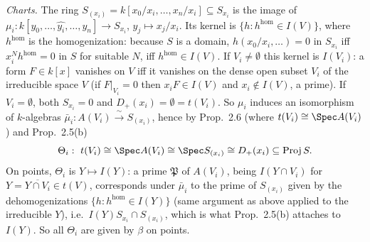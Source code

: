 \documentclass[11pt]{article}
\begin{document}
\emph{Charts.} The ring $S_{(x_i)}=k[x_0/x_i,\dots,x_n/x_i]\subseteq S_{x_i}$ is the image of $\mu_i:k[y_0,\dots,\widehat{y_i},\dots,y_n]\to S_{x_i}$, $y_j\mapsto x_j/x_i$. Its kernel is $\{h: h^{\mathrm{hom}}\in I(V)\}$, where $h^{\mathrm{hom}}$ is the homogenization: because $S$ is a domain, $h(x_0/x_i,\dots)=0$ in $S_{x_i}$ iff $x_i^N h^{\mathrm{hom}}=0$ in $S$ for suitable $N$, iff $h^{\mathrm{hom}}\in I(V)$. If $V_i\neq\emptyset$ this kernel is $I(V_i)$: a form $F\in k[x]$ vanishes on $V$ iff it vanishes on the dense open subset $V_i$ of the irreducible space $V$ (if $F|_{V_i}=0$ then $x_iF\in I(V)$ and $x_i\notin I(V)$, a prime). If $V_i=\emptyset$, both $S_{x_i}=0$ and $D_+(x_i)=\emptyset=t(V_i)$. So $\mu_i$ induces an isomorphism of $k$-algebras $\bar\mu_i:A(V_i)\xrightarrow{\ \sim\ }S_{(x_i)}$, hence by Prop.~2.6 (where $t(V_i)\cong\Spec A(V_i)$) and Prop.~2.5(b)
\[\Theta_i:\ t(V_i)\cong\Spec A(V_i)\cong\Spec S_{(x_i)}\cong D_+(x_i)\subseteq\operatorname{Proj}S.\]
On points, $\Theta_i$ is $Y\mapsto I(Y)$: a prime $\mathfrak P$ of $A(V_i)$, being $I(Y\cap V_i)$ for $Y=\overline{Y\cap V_i}\in t(V)$, corresponds under $\bar\mu_i$ to the prime of $S_{(x_i)}$ given by the dehomogenizations $\{h:h^{\mathrm{hom}}\in I(Y)\}$ (same argument as above applied to the irreducible $Y$), i.e.\ $I(Y)S_{x_i}\cap S_{(x_i)}$, which is what Prop.~2.5(b) attaches to $I(Y)$. So all $\Theta_i$ are given by $\beta$ on points.
\end{document}
